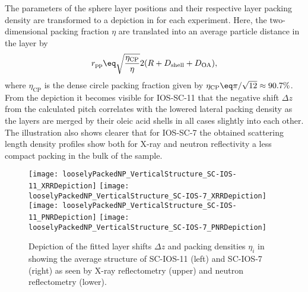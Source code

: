 \documentclass[\main/dresen_thesis.tex]{subfiles}
\begin{document}
  The parameters of the sphere layer positions and their respective layer packing density are transformed to a depiction in  for each experiment.
  Here, the two-dimensional packing fraction $\eta$ are translated into an average particle distance in the layer by
  \begin{align}
    r_\mathrm{pp} \eq \sqrt{\frac{\eta_\mathrm{CP}}{\eta}} 2 (R + D_\mathrm{shell} + D_\mathrm{OA}),
  \end{align}
  where $\eta_\mathrm{CP}$ is the dense circle packing fraction given by $\eta_\mathrm{CP} \eq \pi / \sqrt{12} \approx 90.7 \%$.
  From the depiction it becomes visible for IOS-SC-11 that the negative shift $\Delta z$ from the calculated pitch correlates with the lowered lateral packing density as the layers are merged by their oleic acid shells in all cases slightly into each other.
  The illustration also shows clearer that for IOS-SC-7 the obtained scattering length density profiles show both for X-ray and neutron reflectivity a less compact packing in the bulk of the sample.

  \begin{figure}[tb]
    \centering
    \texttt{[image: looselyPackedNP\_VerticalStructure\_SC-IOS-11\_XRRDepiction]}
    \texttt{[image: looselyPackedNP\_VerticalStructure\_SC-IOS-7\_XRRDepiction]}
    \texttt{[image: looselyPackedNP\_VerticalStructure\_SC-IOS-11\_PNRDepiction]}
    \texttt{[image: looselyPackedNP\_VerticalStructure\_SC-IOS-7\_PNRDepiction]}
    \caption{\label{fig:looselyPackedNP:layer:reflectivityDepiction}Depiction of the fitted layer shifts $\Delta z$ and packing densities $\eta_i$ in  showing the average structure of SC-IOS-11 (left) and SC-IOS-7 (right) as seen by X-ray reflectometry (upper) and neutron reflectometry (lower).}
  \end{figure}
\end{document}
